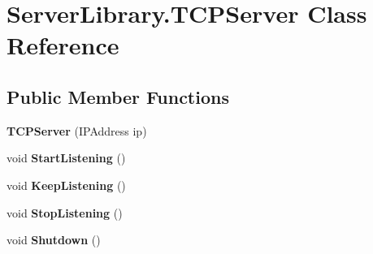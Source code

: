 \hypertarget{class_server_library_1_1_t_c_p_server}{
\section{ServerLibrary.TCPServer Class Reference}
\label{class_server_library_1_1_t_c_p_server}
}
\subsection*{Public Member Functions}
\begin{DoxyCompactItemize}
\item 
\hypertarget{class_server_library_1_1_t_c_p_server_a1f17f6dccfdffeb5ccc32670d49bf725}{
{\bfseries TCPServer} (IPAddress ip)}
\label{class_server_library_1_1_t_c_p_server_a1f17f6dccfdffeb5ccc32670d49bf725}

\item 
\hypertarget{class_server_library_1_1_t_c_p_server_a237217c2bd9e71dc7ab4fb65861e7dc8}{
void {\bfseries StartListening} ()}
\label{class_server_library_1_1_t_c_p_server_a237217c2bd9e71dc7ab4fb65861e7dc8}

\item 
\hypertarget{class_server_library_1_1_t_c_p_server_aed031e376180538112b3b638827abd3a}{
void {\bfseries KeepListening} ()}
\label{class_server_library_1_1_t_c_p_server_aed031e376180538112b3b638827abd3a}

\item 
\hypertarget{class_server_library_1_1_t_c_p_server_aa11f7f5ab6dde97651ad8db8cd5181db}{
void {\bfseries StopListening} ()}
\label{class_server_library_1_1_t_c_p_server_aa11f7f5ab6dde97651ad8db8cd5181db}

\item 
\hypertarget{class_server_library_1_1_t_c_p_server_ab5805edcb6a87de85827aee0b8cfc254}{
void {\bfseries Shutdown} ()}
\label{class_server_library_1_1_t_c_p_server_ab5805edcb6a87de85827aee0b8cfc254}

\end{DoxyCompactItemize}
